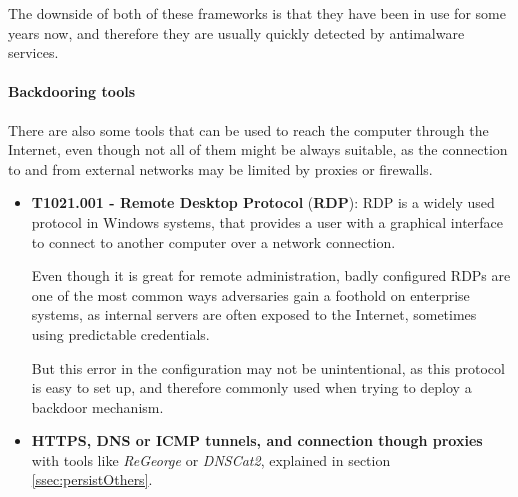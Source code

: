 The downside of both of these frameworks is that they have been in use for some years now, and therefore they are usually quickly detected by antimalware services.


\paragraph{Backdooring tools}
There are also some tools that can be used to reach the computer through the Internet, even though not all of them might be always suitable, as the connection to and from external networks may be limited by proxies or firewalls.

\begin{itemize}
\item \textbf{T1021.001 - Remote Desktop Protocol} (\textbf{RDP}): RDP is a widely used protocol in Windows systems, that provides a user with a graphical interface to connect to another computer over a network connection. 

Even though it is great for remote administration, badly configured RDPs are one of the most common ways adversaries gain a foothold on enterprise systems, as internal servers are often exposed to the Internet, sometimes using predictable credentials.

But this error in the configuration may not be unintentional, as this protocol is easy to set up, and therefore commonly used when trying to deploy a backdoor mechanism. 
\item \textbf{HTTPS, DNS or ICMP tunnels, and connection though proxies} with tools like \textit{ReGeorge} or \textit{DNSCat2}, explained in section \ref{ssec:persistOthers}.
\end{itemize}